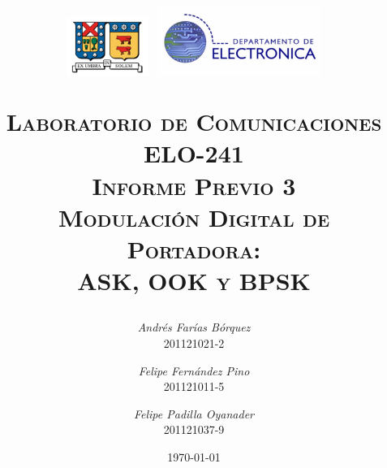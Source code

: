 
\begin{titlepage}
\title{\begin{minipage}{\textwidth}
\vspace{-9em}
\includegraphics[width=0.2\textwidth]{img/logo_utfsm}
\hfill
\includegraphics[width=0.4\textwidth]{img/logoelo2}
\vspace{1em}
\end{minipage}
\HRule \vspace{1em} \textsc{Laboratorio de Comunicaciones\\ELO-241\\ \Large \vspace{1em} \textbf{Informe Previo 3}\\Modulación Digital de Portadora:\\ASK, OOK y BPSK} \HRule \vspace{3em}}
\author{\textsl{Andrés Farías Bórquez}\\201121021-2 \and \textsl{Felipe Fernández Pino}\\201121011-5 \and \textsl{Felipe Padilla Oyanader}\\201121037-9}
\date{\vfill \today}
\end{titlepage}

\pagestyle{fancy}
